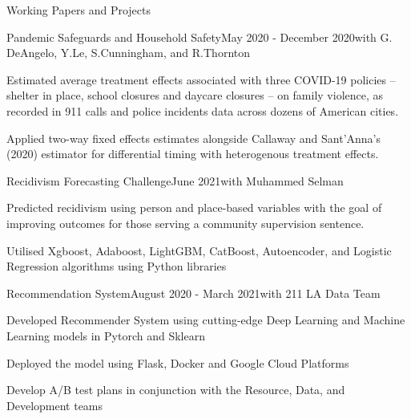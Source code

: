 \documentclass{resume} %
\begin{document}
\begin{rSection}{Working Papers and Projects}
\begin{rSubsection}{Pandemic Safeguards and Household Safety}{May 2020 - December 2020}{with G. DeAngelo, Y.Le, S.Cunningham, and R.Thornton}{}
\item Estimated average treatment effects associated with three COVID-19 policies – shelter in place, school closures and daycare closures – on family violence, as recorded in 911 calls and police incidents data across dozens of American cities.
\item Applied two-way fixed effects estimates alongside Callaway and Sant’Anna’s (2020) estimator for differential timing with heterogenous treatment effects.
\end{rSubsection}

\newpage 
\begin{rSubsection}{Recidivism Forecasting Challenge}{June 2021}{with Muhammed Selman}{}
\item Predicted recidivism using person and place-based variables with the goal of improving outcomes for those serving a community supervision sentence.
\item Utilised Xgboost, Adaboost, LightGBM, CatBoost, Autoencoder, and Logistic Regression algorithms using Python libraries 
\end{rSubsection}

\begin{rSubsection}{Recommendation System}{August 2020 - March 2021}{with 211 LA Data Team}{}
\item Developed Recommender System using cutting-edge Deep Learning and Machine Learning models in Pytorch and Sklearn 
\item Deployed the model using Flask, Docker and Google Cloud Platforms
\item Develop A/B test plans in conjunction with the Resource, Data, and Development teams
\end{rSubsection}


\end{rSection}
\end{document}
